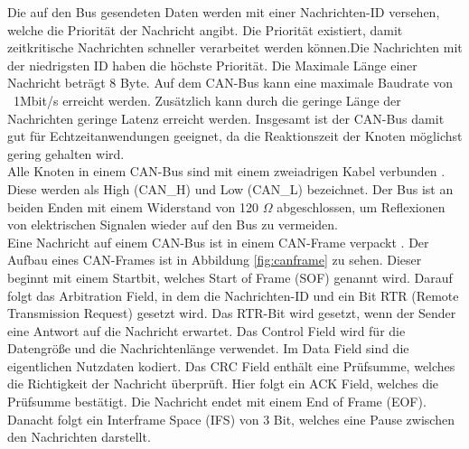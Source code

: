 Die auf den Bus gesendeten Daten werden mit einer Nachrichten-ID
versehen, welche die Priorität der Nachricht angibt. Die Priorität existiert, damit zeitkritische Nachrichten
schneller verarbeitet werden können.Die Nachrichten mit der niedrigsten ID haben die höchste Priorität.
Die Maximale Länge einer Nachricht beträgt 8 Byte. 
Auf dem CAN-Bus kann eine maximale Baudrate von \ 1Mbit/s erreicht werden.
Zusätzlich kann durch die geringe Länge der Nachrichten geringe Latenz erreicht werden. 
Insgesamt ist der CAN-Bus damit gut für Echtzeitanwendungen geeignet, da die Reaktionszeit der Knoten möglichst gering gehalten wird.
\\
Alle Knoten in einem CAN-Bus sind mit einem zweiadrigen Kabel verbunden \cite[Seite 132]{Voss2008}. 
Diese werden als High (CAN\_H) und Low (CAN\_L) 
bezeichnet. Der Bus ist an beiden Enden mit einem Widerstand von 120 $\Omega$ abgeschlossen, um Reflexionen von 
elektrischen Signalen wieder auf den Bus zu vermeiden.
\\
Eine Nachricht auf einem CAN-Bus ist in einem CAN-Frame verpackt \cite[Seite 36]{Voss2008}. 
Der Aufbau eines CAN-Frames ist in Abbildung \ref{fig:canframe} zu sehen.
Dieser beginnt mit einem Startbit, welches Start of Frame (SOF) genannt wird. Darauf folgt das Arbitration Field, 
in dem die Nachrichten-ID und ein Bit RTR (Remote Transmission Request) gesetzt wird. Das RTR-Bit wird gesetzt,
wenn der Sender eine Antwort auf die Nachricht erwartet. Das Control Field wird für die Datengröße und die Nachrichtenlänge
verwendet. Im Data Field sind die eigentlichen Nutzdaten kodiert. Das CRC Field enthält eine Prüfsumme, welches die Richtigkeit
der Nachricht überprüft. Hier folgt ein ACK Field, welches die Prüfsumme bestätigt. Die Nachricht endet mit einem End of Frame (EOF).
Danacht folgt ein Interframe Space (IFS) von 3 Bit, welches eine Pause zwischen den Nachrichten darstellt.

